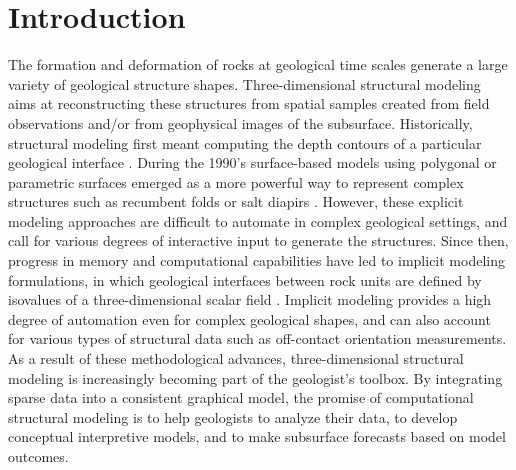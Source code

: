 \documentclass[preprint]{elsarticle}
\begin{document}
\section*{Introduction}

The formation and deformation of rocks at geological time scales generate a large variety of geological structure shapes. Three-dimensional structural modeling aims at reconstructing these structures from spatial samples created from field observations and/or from geophysical images of the subsurface. Historically, structural modeling first meant computing the depth contours of a particular geological interface \citep[e.g.,][]{Walters1969AB,Hardy1971JGR,Briggs1974G,Bolondi1976G}. During the 1990's surface-based models using polygonal or parametric surfaces emerged as a more powerful way to represent complex structures such as recumbent folds or salt diapirs \citep{Mallet1992CD,deKemp1999CG}. However, these explicit modeling approaches are difficult to automate in complex geological settings, and call for various degrees of interactive input to generate the structures. Since then, progress in memory and computational capabilities have led to implicit modeling formulations, in which geological interfaces between rock units are defined by isovalues of a three-dimensional scalar field \citep{Lajaunie1997MG,Cowan2002ASGMEM,Calcagno2008PEPI,Frank2007CG,Caumon2013GaRSITo,Souche20137ECEISE2,Hillier2014MG,Laurent2016MG,Laurent2016EaPSL,Martin2017CG,Grose2017JSG,delaVarga2018GMDD,Irakarama2018EAGE,Grose2019JoSG,Renaudeau2019BEMRMX,Renaudeau2019MG,Manchuk2019C&G}.
Implicit modeling provides a high degree of automation even for complex geological shapes, and can also account for various types of structural data such as off-contact orientation  measurements. As a result of these methodological advances, three-dimensional structural modeling is increasingly becoming part of the geologist's toolbox. By integrating sparse data into a consistent graphical model, the promise of computational structural modeling is to help geologists to analyze their data, to develop conceptual interpretive models, and to make subsurface forecasts based on model outcomes. 
\end{document}
